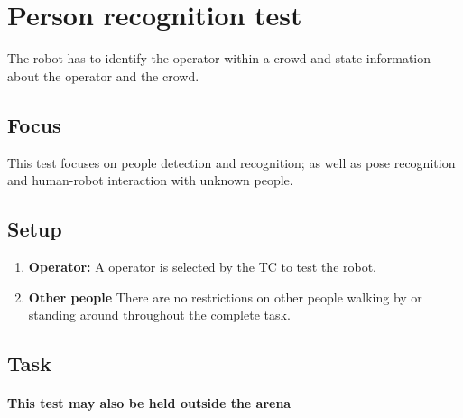 \section{Person recognition test}

The robot has to identify the operator within a crowd and state information about the operator and the crowd.

\subsection{Focus}

This test focuses on people detection and recognition; as well as pose recognition and human-robot interaction with unknown people.

\subsection{Setup}

\begin{enumerate}
\item \textbf{Operator:} A  operator is selected by the TC to test the robot.
\item \textbf{Other people} There are no restrictions on other people walking by or standing around throughout the complete task.
\end{enumerate}

\subsection{Task}
\paragraph{This test may also be held outside the arena}

